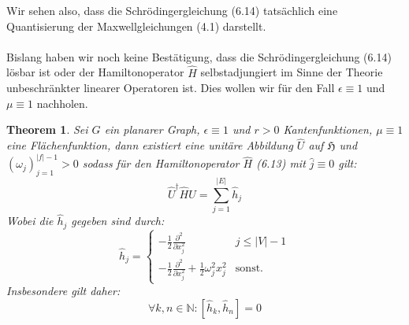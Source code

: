\documentclass[11pt,a4paper,leqno]{report}
\newtheorem{theorem}{Theorem}[chapter]
\numberwithin{equation}{chapter}
\begin{document}
\noindent
Wir sehen also, dass die Schr\"odingergleichung (6.14) tats\"achlich eine Quantisierung der Maxwellgleichungen (4.1) darstellt.
\\
\\

Bislang haben wir noch keine Bestätigung, dass die Schr\"odingergleichung (6.14) l\"osbar ist oder der Hamiltonoperator $\hat{H}$ selbstadjungiert im Sinne der Theorie unbeschr\"ankter linearer Operatoren ist. Dies wollen wir f\"ur den Fall $\epsilon\equiv 1$ und $\mu\equiv 1$ nachholen.
\begin{theorem}
	Sei $G$ ein planarer Graph, $\epsilon\equiv 1$ und $r>0$ Kantenfunktionen, $\mu\equiv 1$ eine Fl\"achenfunktion, dann existiert eine unit\"are Abbildung $\hat{U}$ auf $\mathfrak{H}$ und $(\omega_j)_{j=1}^{|f|-1}>0$ sodass f\"ur den Hamiltonoperator $\hat{H}$ (6.13) mit $\hat{j}\equiv 0 $ gilt:
	\begin{equation}
	\hat{U}^\dagger\hat{H}\hat{U}  = \sum_{j=1}^{|E|}\hat{h}_j
	\end{equation}
Wobei die $\hat{h}_j$ gegeben sind durch:
\[\hat{h}_j= \begin{cases} 
-\frac{1}{2}\frac{\partial^2}{\partial x_j^2} & j\leq |V| - 1 \\
-\frac{1}{2}\frac{\partial^2}{\partial x_j^2} + \frac{1}{2}\omega_j^2 x_j^2 & \text{sonst.} 
\end{cases}
\]
Insbesondere gilt daher:
\begin{equation*}
	\forall k,n \in \mathbb{N}:[\hat{h}_k, \hat{h}_n]=0 
\end{equation*}
\end{theorem}
\end{document}
